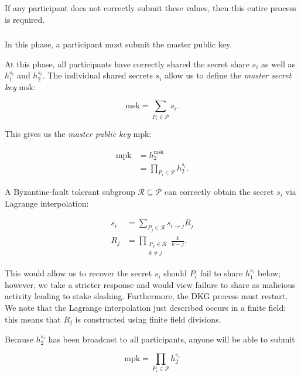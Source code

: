 If any participant does not correctly submit these values,
then this entire process is required.



\subsubsection{\MasterPublicKey{}}
\label{sssec:mpk_submission}
In this phase, a participant must submit the master public key.

At this phase, all participants have correctly shared
the secret share $s_{i}$ as well as $h_{1}^{s_{i}}$ and $h_{2}^{s_{i}}$.
The individual shared secrets $s_{i}$ allow us to define the
\emph{master secret key} $\text{msk}$:

\begin{equation}
    \text{msk} = \sum_{P_{i}\in\mathcal{P}} s_{i}.
\end{equation}

\noindent
This gives us the \emph{master public key} $\text{mpk}$:

\begin{align}
    \text{mpk} &= h_{2}^{\text{msk}} \nonumber\\
        &= \prod_{P_{i}\in\mathcal{P}} h_{2}^{s_{i}}.
\end{align}

\noindent
A Byzantine-fault tolerant subgroup $\mathcal{R}\subseteq\mathcal{P}$ can
correctly obtain the secret $s_{i}$ via Lagrange interpolation:

\begin{align}
    s_{i} &= \sum_{P_{j}\in\mathcal{R}} s_{i\to j} R_{j} \nonumber\\
    R_{j} &= \prod_{\substack{P_{k}\in\mathcal{R} \\ k\ne j}} \frac{k}{k-j}.
    \label{eq:Rj_coefs}
\end{align}

\noindent
This would allow us to recover the secret $s_{i}$ should $P_{i}$
fail to share $h_{1}^{s_{i}}$ below; however,
we take a stricter response and would view failure to share
as malicious activity leading to stake slashing.
Furthermore, the DKG process must restart.
We note that the Lagrange interpolation just described
occurs in a finite field;
this means that $R_{j}$ is constructed using finite field divisions.

Because $h_{2}^{s_{i}}$ has been broadcast to all participants,
anyone will be able to submit

\begin{equation}
    \text{mpk} = \prod_{P_{i}\in\mathcal{P}} h_{2}^{s_{i}}
\end{equation}

